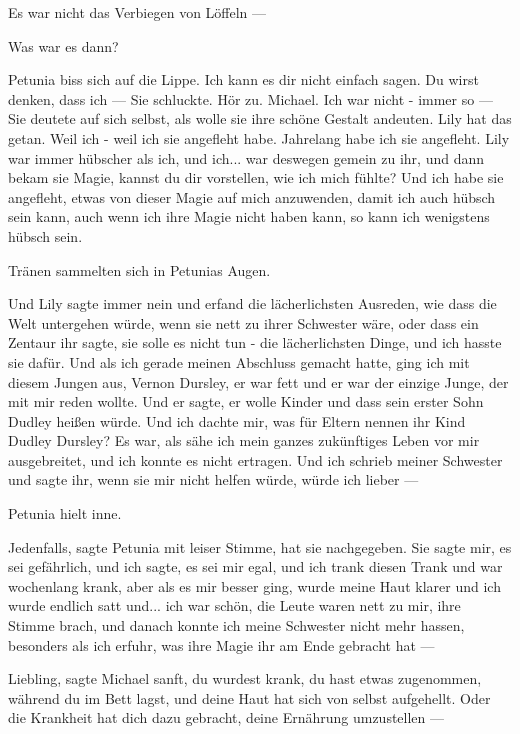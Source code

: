 \glqq{}Es war nicht das Verbiegen von Löffeln ---\grqq{}

\glqq{}Was war es dann?\grqq{}

Petunia biss sich auf die Lippe. \glqq{}Ich kann es dir nicht einfach sagen. Du
wirst denken, dass ich ---\grqq{} Sie schluckte. \glqq{}Hör zu. Michael. Ich war
nicht - immer so ---\grqq{} Sie deutete auf sich selbst, als wolle sie ihre
schöne Gestalt andeuten. \glqq{}Lily hat das getan. Weil ich - weil ich sie
angefleht habe. Jahrelang habe ich sie angefleht. Lily war immer hübscher als
ich, und ich... war deswegen gemein zu ihr, und dann bekam sie Magie, kannst du
dir vorstellen, wie ich mich fühlte? Und ich habe sie angefleht, etwas von
dieser Magie auf mich anzuwenden, damit ich auch hübsch sein kann, auch wenn ich
ihre Magie nicht haben kann, so kann ich wenigstens hübsch sein.\grqq{}

Tränen sammelten sich in Petunias Augen.

\glqq{}Und Lily sagte immer nein und erfand die lächerlichsten Ausreden, wie dass
die Welt untergehen würde, wenn sie nett zu ihrer Schwester wäre, oder dass ein
Zentaur ihr sagte, sie solle es nicht tun - die lächerlichsten Dinge, und ich
hasste sie dafür. Und als ich gerade meinen Abschluss gemacht hatte, ging ich
mit diesem Jungen aus, Vernon Dursley, er war fett und er war der einzige Junge,
der mit mir reden wollte. Und er sagte, er wolle Kinder und dass sein erster
Sohn Dudley heißen würde. Und ich dachte mir, was für Eltern nennen ihr Kind
Dudley Dursley? Es war, als sähe ich mein ganzes zukünftiges Leben vor mir
ausgebreitet, und ich konnte es nicht ertragen. Und ich schrieb meiner Schwester
und sagte ihr, wenn sie mir nicht helfen würde, würde ich lieber ---\grqq{}

Petunia hielt inne.

\glqq{}Jedenfalls\grqq{}, sagte Petunia mit leiser Stimme, \glqq{}hat sie
nachgegeben. Sie sagte mir, es sei gefährlich, und ich sagte, es sei mir egal,
und ich trank diesen Trank und war wochenlang krank, aber als es mir besser
ging, wurde meine Haut klarer und ich wurde endlich satt und... ich war schön,
die Leute waren nett zu mir\grqq{}, ihre Stimme brach, \glqq{}und danach konnte
ich meine Schwester nicht mehr hassen, besonders als ich erfuhr, was ihre Magie
ihr am Ende gebracht hat ---\grqq{}

\glqq{}Liebling\grqq{}, sagte Michael sanft, \glqq{}du wurdest krank, du hast
etwas zugenommen, während du im Bett lagst, und deine Haut hat sich von selbst
aufgehellt. Oder die Krankheit hat dich dazu gebracht, deine Ernährung
umzustellen ---\grqq{}

